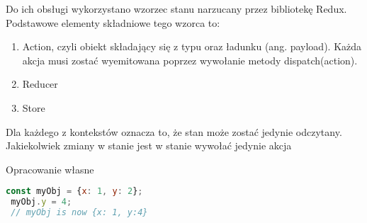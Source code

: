 \documentclass[skorowidz,skroty]{dyplomWEZUT}
\begin{document}
Do ich obsługi wykorzystano wzorzec stanu narzucany przez bibliotekę Redux. Podstawowe elementy składniowe tego wzorca to:
\begin{enumerate}

	\item Action, czyli obiekt składający się z typu oraz ładunku (ang. payload). Każda akcja musi zostać wyemitowana poprzez wywołanie metody dispatch(action). 
	
	\item Reducer
	
	\item Store
	
\end{enumerate}
 Dla każdego z kontekstów oznacza to, że stan może zostać jedynie odczytany. Jakiekolwiek zmiany w stanie jest w stanie wywołać jedynie akcja 

{Opracowanie własne}{\label{code: js mutate}}
\begin{lstlisting}[language=JavaScript]
 const myObj = {x: 1, y: 2};
 myObj.y = 4;
 // myObj is now {x: 1, y:4}
\end{lstlisting}
\end{document}
